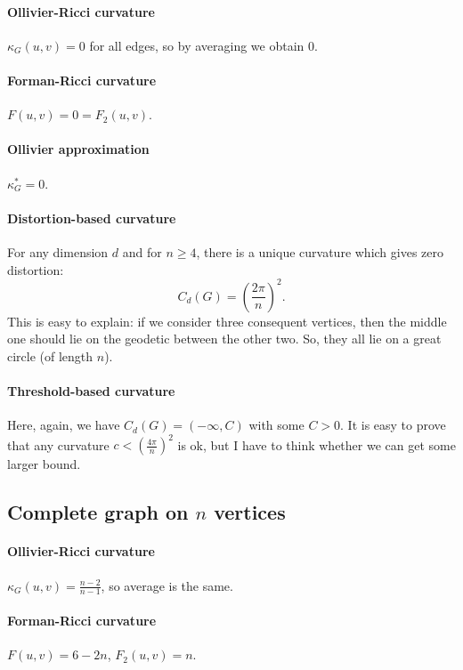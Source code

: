 \documentclass{article}
\begin{document}
\paragraph{Ollivier-Ricci curvature} $\kappa_G(u,v) = 0$ for all edges, so by averaging we obtain $0$.

\paragraph{Forman-Ricci curvature} $F(u,v) = 0 = F_2(u,v)$.

\paragraph{Ollivier approximation} $\kappa_G^* = 0$.

\paragraph{Distortion-based curvature} For any dimension $d$ and for $n \ge 4$, there is a unique curvature which gives zero distortion:
\[
C_d(G) = \left(\frac{2\pi}{n}\right)^2.
\]
This is easy to explain: if we consider three consequent vertices, then the middle one should lie on the geodetic between the other two. So, they all lie on a great circle (of length $n$).

\paragraph{Threshold-based curvature} 
Here, again, we have $C_d(G) = (-\infty, C)$ with some $C>0$. It is easy to prove that any curvature $c < \left(\frac{4\pi}{n}\right)^2$ is ok, but I have to think whether we can get some larger bound. 

\subsection{Complete graph on $n$ vertices}

\paragraph{Ollivier-Ricci curvature} 
        
$\kappa_G(u,v) = \frac{n-2}{n-1}$, so average is the same.

\paragraph{Forman-Ricci curvature} $F(u,v) = 6 - 2n$, $F_2(u,v) = n$.
\end{document}
